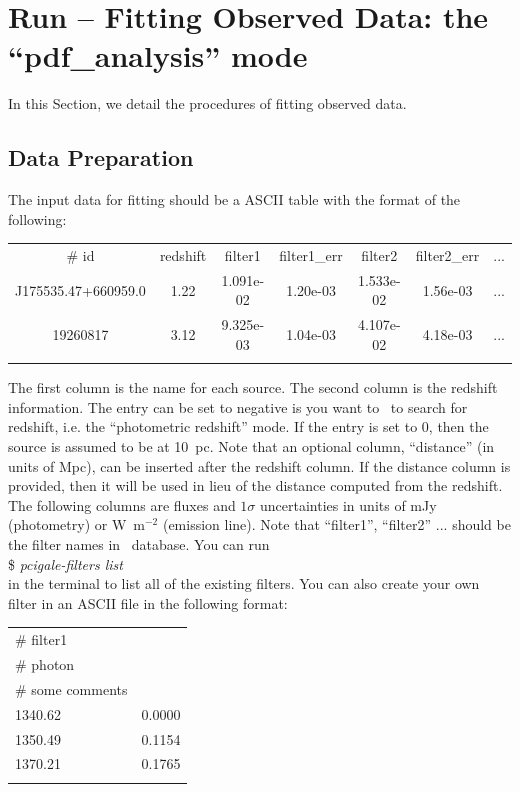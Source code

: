 \section{Run -- Fitting Observed Data: the ``pdf\_analysis'' mode}\label{sec:pdf}
In this Section, we detail the procedures of fitting observed data.

\subsection{Data Preparation}
\label{sec:data}
The input data for fitting should be a ASCII table with the format of the following: \\

\begin{tabular}{ccccccc} 
\# id & redshift & filter1 & filter1\_err & filter2 & filter2\_err & ... \\ 
J175535.47+660959.0 & 1.22 &  1.091e-02 & 1.20e-03 & 1.533e-02 & 1.56e-03 & ... \\
19260817 & 3.12 &  9.325e-03 & 1.04e-03 & 4.107e-02 & 4.18e-03 & ... \\ \\
\end{tabular}

The first column is the name for each source. 
The second column is the redshift information. 
The entry can be set to negative is you want to \xcig\ to search for redshift, i.e. the ``photometric redshift'' mode. 
If the entry is set to 0, then the source is assumed to be at 10~pc. Note that an optional column, ``distance'' (in units of Mpc), can be inserted after the redshift column. 
If the distance column is provided, then it will be used in lieu of the distance computed from the redshift.
The following columns are fluxes and $1\sigma$ uncertainties 
in units of mJy (photometry) or W~m$^{-2}$ (emission line).
Note that ``filter1'', ``filter2'' ... should be the filter names in \xcig\ database. 
You can run \\
\$ \textit{pcigale-filters list} \\
in the terminal to list all of the existing filters. 
You can also create your own filter in an ASCII file in the following format: \\

\begin{tabular}{ll} 
\# filter1 \\
\# photon \\
\# some comments \\
1340.62 & 0.0000 \\
1350.49 & 0.1154 \\
1370.21 & 0.1765 \\
\\
\end{tabular}

